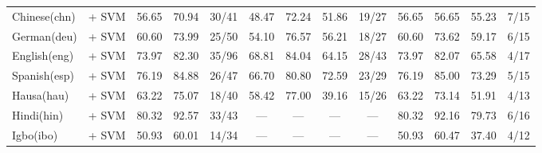 \begin{table*}[h]
{\begin{tabular}{l|c|ccc|cccc|cccc}
            Chinese(chn)         & \citep{zpoint-large-embedding-zh} + SVM                                & 56.65                        & 70.94                        & 30/41                       & 48.47         & 72.24         & 51.86             & 19/27         & 56.65         & 56.65         & 55.23             & 7/15          \\
            German(deu)          & \citep{wang2024multilingual}       + SVM                               & 60.60                        & 73.99                        & 25/50                       & 54.10         & 76.57         & 56.21             & 18/27         & 60.60         & 73.62         & 59.17             & 6/15          \\
            English(eng)         & \citep{zhang2025jasperstelladistillationsota}  + SVM                   & 73.97                        & 82.30                        & 35/96                       & 68.81         & 84.04         & 64.15             & 28/43         & 73.97         & 82.07         & 65.58             & 4/17          \\
            Spanish(esp)         & \citep{wang2024multilingual}      + SVM                                & 76.19                        & 84.88                        & 26/47                       & 66.70         & 80.80         & 72.59             & 23/29         & 76.19         & 85.00         & 73.29             & 5/15          \\
            Hausa(hau)           & \citep{dobler-demelo-2023-focus} + SVM                                 & 63.22                        & 75.07                        & 18/40                       & 58.42         & 77.00         & 39.16             & 15/26         & 63.22         & 73.14         & 51.91             & 4/13          \\
            Hindi(hin)           & \citep{wang2024multilingual}  + SVM                                    & 80.32                        & 92.57                        & 33/43                       & —             & —             & —                 & —             & 80.32         & 92.16         & 79.73             & 6/16          \\
            Igbo(ibo)            & \citep{wang2024multilingual}   + SVM                                   & 50.93                        & 60.01                        & 14/34                       & —             & —             & —                 & —             & 50.93         & 60.47         & 37.40             & 4/12          \\

\end{tabular}}
\end{table*}
